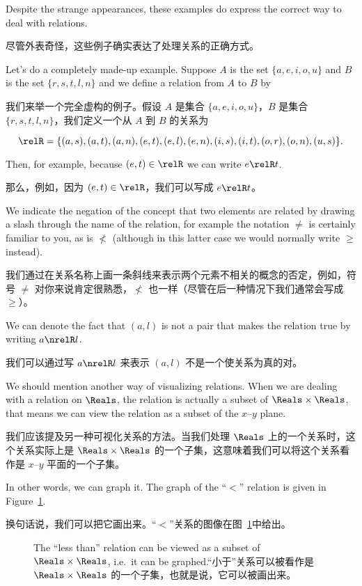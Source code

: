 Despite the strange appearances, these 
examples do express the correct way to deal with relations.

尽管外表奇怪，这些例子确实表达了处理关系的正确方式。

Let's do a completely made-up example.  Suppose $A$ is the set
$\{a,e,i,o,u\}$ and $B$ is the set $\{r,s,t,l,n\}$ and we define 
a relation from $A$ to $B$ by

我们来举一个完全虚构的例子。假设 $A$ 是集合 $\{a,e,i,o,u\}$，$B$ 是集合 $\{r,s,t,l,n\}$，我们定义一个从 $A$ 到 $B$ 的关系为

\[ \relR = \{ (a,s), (a,t), (a,n), (e,t), (e,l), (e,n), (i,s), (i,t), (o,r), (o,n), (u,s) \}.
\]

Then, for example, because $(e,t) \in \relR$ we can write $e \relR t$.

那么，例如，因为 $(e,t) \in \relR$，我们可以写成 $e \relR t$。

We indicate the
negation of the concept that two elements are related by drawing a slash 
through the name of the relation, for example the notation $\neq$ is certainly
familiar to you, as is $\nless$ (although in this latter case we 
would normally write $\geq$ instead).

我们通过在关系名称上画一条斜线来表示两个元素不相关的概念的否定，例如，符号 $\neq$ 对你来说肯定很熟悉，$\nless$ 也一样（尽管在后一种情况下我们通常会写成 $\geq$）。

We can denote the fact that
$(a,l)$ is not a pair that makes the relation true by writing $a \nrelR l$.

我们可以通过写 $a \nrelR l$ 来表示 $(a,l)$ 不是一个使关系为真的对。

We should mention another way of visualizing
relations.  When we are dealing with a relation on $\Reals$, the
relation is actually a subset of $\Reals \times \Reals$, that means 
we can view the relation as a subset of the $x$--$y$ plane.

我们应该提及另一种可视化关系的方法。当我们处理 $\Reals$ 上的一个关系时，这个关系实际上是 $\Reals \times \Reals$ 的一个子集，这意味着我们可以将这个关系看作是 $x$--$y$ 平面的一个子集。

In other 
words, we can graph it.  The graph of the ``$<$'' relation is
given in Figure~\ref{fig:lt_graph}.

换句话说，我们可以把它画出来。“$<$”关系的图像在图~\ref{fig:lt_graph}中给出。

\begin{figure}[!hbtp]
\begin{center}

\end{center}
\caption[The graph of the ``less than'' relation.“小于”关系的图像。]{The ``less than'' relation %
can be viewed as a subset of $\Reals \times \Reals$, i.e.\ it can be graphed.“小于”关系可以被看作是 $\Reals \times \Reals$ 的一个子集，也就是说，它可以被画出来。}
\label{fig:lt_graph} 
\end{figure}
  

